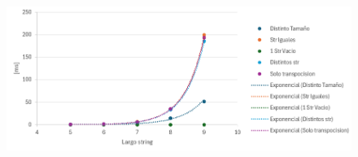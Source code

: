 \begin{figure}[H]
    \centering
    \includegraphics[width=1\linewidth]{AlgoReportTemplate-main//images/GraphBruteForce.png}
    \label{fig:enter-label}
\end{figure}
\vspace{5px}

